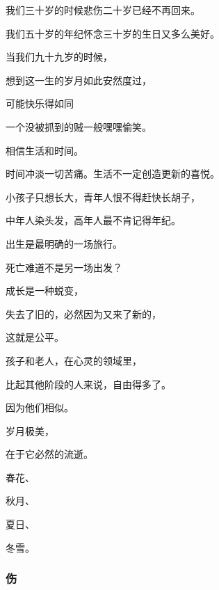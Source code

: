 \par 我们三十岁的时候悲伤二十岁已经不再回来。
\par 我们五十岁的年纪怀念三十岁的生日又多么美好。
\par 当我们九十九岁的时候，
\par 想到这一生的岁月如此安然度过，
\par 可能快乐得如同
\par 一个没被抓到的贼一般嘿嘿偷笑。
\par 
\par 相信生活和时间。
\par 时间冲淡一切苦痛。生活不一定创造更新的喜悦。
\par 
\par 小孩子只想长大，青年人恨不得赶快长胡子，
\par 中年人染头发，高年人最不肯记得年纪。
\par 
\par 出生是最明确的一场旅行。
\par 死亡难道不是另一场出发？
\par 
\par 成长是一种蜕变，
\par 失去了旧的，必然因为又来了新的，
\par 这就是公平。
\par 
\par 孩子和老人，在心灵的领域里，
\par 比起其他阶段的人来说，自由得多了。
\par 因为他们相似。
\par 
\par 岁月极美，
\par 在于它必然的流逝。
\par 春花、
\par 秋月、
\par 夏日、
\par 冬雪。



\subsubsection{伤}

